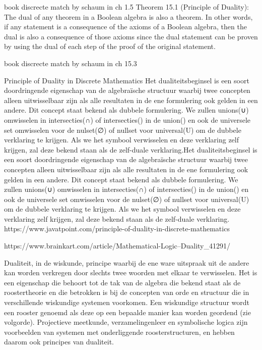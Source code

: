 \documentclass{article}
\begin{document}
		book discrecte match by schaum in ch 1.5
	Theorem 15.1 (Principle of Duality): The dual of any theorem in a Boolean algebra is also a theorem.
	In other words, if any statement is a consequence of the axioms of a Boolean algebra, then the dual is also a
	consequence of those axioms since the dual statement can be proven by using the dual of each step of the proof
	of the original statement.
	
	book discrecte match by schaum in ch 15.3
	
	
	Principle of Duality in Discrete Mathematics
Het dualiteitsbeginsel is een soort doordringende eigenschap van de algebraïsche structuur waarbij twee concepten alleen uitwisselbaar zijn als alle resultaten in de ene formulering ook gelden in een andere. Dit concept staat bekend als dubbele formulering. We zullen unions(∪) omwisselen in intersecties(∩) of intersecties() in de union() en ook de universele set omwisselen voor de nulset(∅) of nullset voor universal(U) om de dubbele verklaring te krijgen. Als we het symbool verwisselen en deze verklaring zelf krijgen, zal deze bekend staan als de zelf-duale verklaring.Het dualiteitsbeginsel is een soort doordringende eigenschap van de algebraïsche structuur waarbij twee concepten alleen uitwisselbaar zijn als alle resultaten in de ene formulering ook gelden in een andere. Dit concept staat bekend als dubbele formulering. We zullen unions(∪) omwisselen in intersecties(∩) of intersecties() in de union() en ook de universele set omwisselen voor de nulset(∅) of nullset voor universal(U) om de dubbele verklaring te krijgen. Als we het symbool verwisselen en deze verklaring zelf krijgen, zal deze bekend staan als de zelf-duale verklaring.
	https://www.javatpoint.com/principle-of-duality-in-discrete-mathematics
	
	
	https://www.brainkart.com/article/Mathematical-Logic--Duality_41291/
	
	
Dualiteit, in de wiskunde, principe waarbij de ene ware uitspraak uit de andere kan worden verkregen door slechts twee woorden met elkaar te verwisselen. Het is een eigenschap die behoort tot de tak van de algebra die bekend staat als de roostertheorie en die betrokken is bij de concepten van orde en structuur die in verschillende wiskundige systemen voorkomen. Een wiskundige structuur wordt een rooster genoemd als deze op een bepaalde manier kan worden geordend (zie volgorde). Projectieve meetkunde, verzamelingenleer en symbolische logica zijn voorbeelden van systemen met onderliggende roosterstructuren, en hebben daarom ook principes van dualiteit.
	
\end{document}
